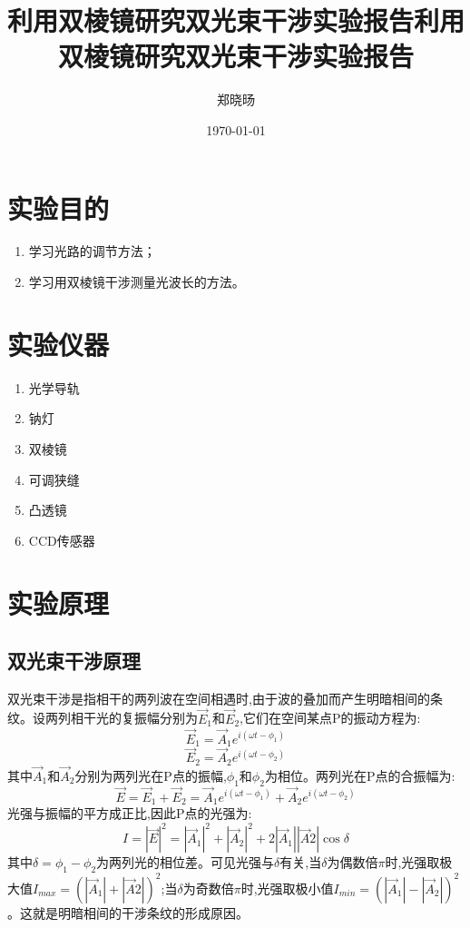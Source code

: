 \documentclass[UTF8]{ctexart}
\title{利用双棱镜研究双光束干涉实验报告}
\title{利用双棱镜研究双光束干涉实验报告}
\author{郑晓旸}
\date{\today}
\begin{document}
\fancyfoot[C]{\thepage}

\maketitle
\tableofcontents
\newpage

\section{实验目的}
    \begin{enumerate}
            \item 学习光路的调节方法；
            \item 学习用双棱镜干涉测量光波长的方法。
    \end{enumerate} 


\section{实验仪器}
\begin{enumerate}
    \item 光学导轨
    \item 钠灯
    \item 双棱镜
    \item 可调狭缝
    \item 凸透镜
    \item CCD传感器
\end{enumerate}

\section{实验原理}

\subsection{双光束干涉原理}
双光束干涉是指相干的两列波在空间相遇时,由于波的叠加而产生明暗相间的条纹。设两列相干光的复振幅分别为$\vec{E}_1$和$\vec{E}_2$,它们在空间某点P的振动方程为:\\
$$\vec{E}_1=\vec{A}_1e^{i(\omega t-\phi_1)}$$
$$\vec{E}_2=\vec{A}_2e^{i(\omega t-\phi_2)}$$
其中$\vec{A}_1$和$\vec{A}_2$分别为两列光在P点的振幅,$\phi_1$和$\phi_2$为相位。两列光在P点的合振幅为:
$$\vec{E}=\vec{E}_1+\vec{E}_2=\vec{A}_1e^{i(\omega t-\phi_1)}+\vec{A}_2e^{i(\omega t-\phi_2)}$$
光强与振幅的平方成正比,因此P点的光强为:
$$I=|\vec{E}|^2=|\vec{A}_1|^2+|\vec{A}_2|^2+2|\vec{A}_1||\vec{A}2|\cos\delta$$
其中$\delta=\phi_1-\phi_2$为两列光的相位差。可见光强与$\delta$有关,当$\delta$为偶数倍$\pi$时,光强取极大值$I_{max}=(|\vec{A}_1|+|\vec{A}2|)^2$;当$\delta$为奇数倍$\pi$时,光强取极小值$I_{min}=(|\vec{A}_1|-|\vec{A}_2|)^2$。这就是明暗相间的干涉条纹的形成原因。
\end{document}
